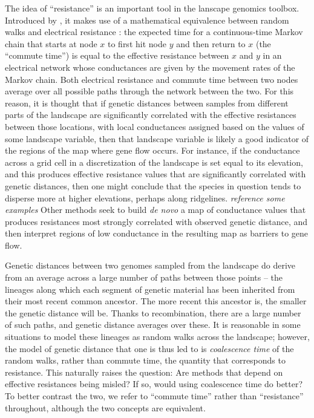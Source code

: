 \documentclass{article}
\newcommand{\plr}[1]{{\em \color{blue} #1}}
\begin{document}
The idea of ``resistance'' is an important tool in the lanscape genomics toolbox.
Introduced by \citet{mcrae},
it makes use of a mathematical equivalence between random walks and electrical resistance
\citep{resistance}:
the expected time for a continuous-time Markov chain that starts at node $x$
to first hit node $y$ and then return to $x$ (the ``commute time'')
is equal to the effective resistance between $x$ and $y$ in an electrical network
whose conductances are given by the movement rates of the Markov chain.
Both electrical resistance and commute time between two nodes
average over all possible paths through the network between the two.
For this reason, it is thought that if genetic distances between samples
from different parts of the landscape
are significantly correlated with the effective resistances between those locations,
with local conductances assigned based on the values of some landscape variable,
then that landscape variable is likely a good indicator of the regions of the map 
where gene flow occurs.
For instance,
if the conductance across a grid cell in a discretization of the landscape
is set equal to its elevation,
and this produces effective resistance values 
that are significantly correlated with genetic distances,
then one might conclude that the species in question tends to disperse more at higher elevations,
perhaps along ridgelines.
\plr{reference some examples}
Other methods \citep{eems} seek to build \emph{de novo} 
a map of conductance values that produces resistances 
most strongly correlated with observed genetic distance,
and then interpret regions of low conductance in the resulting map as barriers to gene flow.

Genetic distances between two genomes sampled from the landscape
do derive from an average across a large number of paths between those points --
the lineages along which each segment of genetic material has been inherited
from their most recent common ancestor.
The more recent this ancestor is,
the smaller the genetic distance will be.
Thanks to recombination, there are a large number of such paths, 
and genetic distance averages over these.
It is reasonable in some situations to model these lineages as random walks across the landscape;
however, the model of genetic distance that one is thus led to
is \emph{coalescence time} of the random walks, 
rather than commute time, the quantity that corresponds to resistance.
This naturally raises the question: 
Are methods that depend on effective resistances being misled?
If so, would using coalescence time do better?
To better contrast the two,
we refer to ``commute time'' rather than ``resistance'' throughout,
although the two concepts are equivalent.
\end{document}

